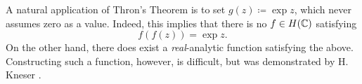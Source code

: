 \begin{example}
    A natural application of Thron's Theorem is to set $g(z) \coloneqq \exp z$, which never assumes zero as a value. Indeed, this implies that there is no $f \in H(\mathbb{C})$ satisfying
    $$ f(f(z)) = \exp z. $$
    On the other hand, there does exist a \emph{real}-analytic function satisfying the above. Constructing such a function, however, is difficult, but was demonstrated by H. Kneser \cite{kneser-real-analytic-solution}.
\end{example}